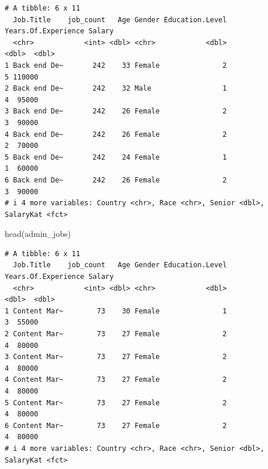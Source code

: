 \documentclass[
  letterpaper,
  DIV=11,
  numbers=noendperiod]{scrartcl}
\newenvironment{Shaded}{\begin{snugshade}}{\end{snugshade}}
\newcommand{\CommentTok}[1]{\textcolor[rgb]{0.37,0.37,0.37}{#1}}
\newcommand{\FunctionTok}[1]{\textcolor[rgb]{0.28,0.35,0.67}{#1}}
\newcommand{\NormalTok}[1]{\textcolor[rgb]{0.00,0.23,0.31}{#1}}
\newcommand{\OtherTok}[1]{\textcolor[rgb]{0.00,0.23,0.31}{#1}}
\newcommand{\SpecialCharTok}[1]{\textcolor[rgb]{0.37,0.37,0.37}{#1}}
\newcommand{\StringTok}[1]{\textcolor[rgb]{0.13,0.47,0.30}{#1}}
\begin{document}
\begin{Shaded}
\end{Shaded}

\begin{verbatim}
# A tibble: 6 x 11
  Job.Title    job_count   Age Gender Education.Level Years.Of.Experience Salary
  <chr>            <int> <dbl> <chr>            <dbl>               <dbl>  <dbl>
1 Back end De~       242    33 Female               2                   5 110000
2 Back end De~       242    32 Male                 1                   4  95000
3 Back end De~       242    26 Female               2                   3  90000
4 Back end De~       242    26 Female               2                   2  70000
5 Back end De~       242    24 Female               1                   1  60000
6 Back end De~       242    26 Female               2                   3  90000
# i 4 more variables: Country <chr>, Race <chr>, Senior <dbl>, SalaryKat <fct>
\end{verbatim}

\begin{Shaded}
\begin{Highlighting}[]
\FunctionTok{head}\NormalTok{(admin\_jobs)}
\end{Highlighting}
\end{Shaded}

\begin{verbatim}
# A tibble: 6 x 11
  Job.Title    job_count   Age Gender Education.Level Years.Of.Experience Salary
  <chr>            <int> <dbl> <chr>            <dbl>               <dbl>  <dbl>
1 Content Mar~        73    30 Female               1                   3  55000
2 Content Mar~        73    27 Female               2                   4  80000
3 Content Mar~        73    27 Female               2                   4  80000
4 Content Mar~        73    27 Female               2                   4  80000
5 Content Mar~        73    27 Female               2                   4  80000
6 Content Mar~        73    27 Female               2                   4  80000
# i 4 more variables: Country <chr>, Race <chr>, Senior <dbl>, SalaryKat <fct>
\end{verbatim}
\end{document}
